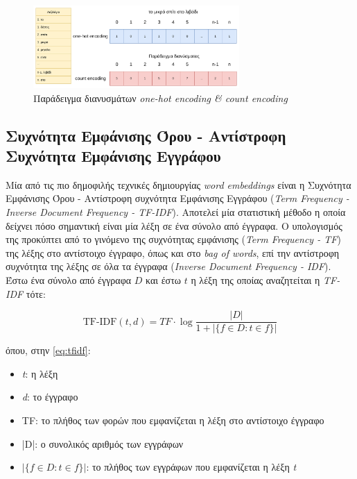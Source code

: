 \begin{figure}[!ht]
  \centering
  \captionsetup{justification=centering}
  \includegraphics[width=0.7\textwidth]{images/chapter2/vector.png}
  \caption{Παράδειγμα διανυσμάτων \emph{one-hot encoding \& count encoding}}
  \label{fig:vector}
\end{figure}
\noindent

\subsection{Συχνότητα Εμφάνισης Όρου - Αντίστροφη Συχνότητα Εμφάνισης Εγγράφου}
Μία από τις πιο δημοφιλής τεχνικές δημιουργίας \emph{word embeddings} είναι η Συχνότητα Εμφάνισης Όρου - Αντίστροφη συχνότητα Εμφάνισης Εγγράφου (\emph{Term Frequency - Inverse Document Frequency - TF-IDF}). Αποτελεί μία στατιστική μέθοδο η οποία δείχνει πόσο σημαντική είναι μία λέξη σε ένα σύνολο από έγγραφα. Ο υπολογισμός της προκύπτει από το γινόμενο της συχνότητας εμφάνισης (\emph{Term Frequency - TF}) της λέξης στο αντίστοιχο έγγραφο, όπως και στο \emph{bag of words}, επί την αντίστροφη συχνότητα της λέξης σε όλα τα έγγραφα (\emph{Inverse Document Frequency - IDF}). Έστω ένα σύνολο από έγγραφα $D$ και έστω $t$ η λέξη της οποίας αναζητείται η \emph{TF-IDF} τότε:

\begin{equation}
    \label{eq:tfidf}
    \text{TF-IDF}(t,d) = TF \cdot \log {\frac{ |D| }{ 1 + | \{ f \in D : t \in f \} |}}
\end{equation}

όπου, στην \autoref{eq:tfidf}:

\begin{itemize}
    \item \emph{t}: η λέξη
    \item \emph{d}: το έγγραφο
    \item TF: το πλήθος των φορών που εμφανίζεται η λέξη στο αντίστοιχο έγγραφο
    \item |D|: ο συνολικός αριθμός των εγγράφων
    \item $| \{ f \in D : t \in f \} |$: το πλήθος των εγγράφων που εμφανίζεται η λέξη \emph{t}
\end{itemize}

